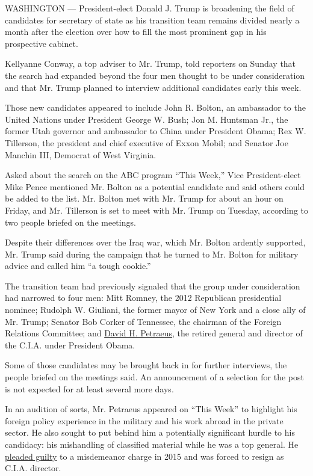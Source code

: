 WASHINGTON --- President-elect Donald J. Trump is broadening the field
of candidates for secretary of state as his transition team remains
divided nearly a month after the election over how to fill the most
prominent gap in his prospective cabinet.

Kellyanne Conway, a top adviser to Mr. Trump, told reporters on Sunday
that the search had expanded beyond the four men thought to be under
consideration and that Mr. Trump planned to interview additional
candidates early this week.

Those new candidates appeared to include John R. Bolton, an ambassador
to the United Nations under President George W. Bush; Jon M. Huntsman
Jr., the former Utah governor and ambassador to China under President
Obama; Rex W. Tillerson, the president and chief executive of Exxon
Mobil; and Senator Joe Manchin III, Democrat of West Virginia.

Asked about the search on the ABC program ``This Week,'' Vice
President-elect Mike Pence mentioned Mr. Bolton as a potential candidate
and said others could be added to the list. Mr. Bolton met with Mr.
Trump for about an hour on Friday, and Mr. Tillerson is set to meet with
Mr. Trump on Tuesday, according to two people briefed on the meetings.

Despite their differences over the Iraq war, which Mr. Bolton ardently
supported, Mr. Trump said during the campaign that he turned to Mr.
Bolton for military advice and called him ``a tough cookie.''

The transition team had previously signaled that the group under
consideration had narrowed to four men: Mitt Romney, the 2012 Republican
presidential nominee; Rudolph W. Giuliani, the former mayor of New York
and a close ally of Mr. Trump; Senator Bob Corker of Tennessee, the
chairman of the Foreign Relations Committee; and
\href{http://topics.nytimes.com/top/reference/timestopics/people/p/david_h_petraeus/index.html?inline=nyt-per}{David
H. Petraeus}, the retired general and director of the C.I.A. under
President Obama.

Some of those candidates may be brought back in for further interviews,
the people briefed on the meetings said. An announcement of a selection
for the post is not expected for at least several more days.

In an audition of sorts, Mr. Petraeus appeared on ``This Week'' to
highlight his foreign policy experience in the military and his work
abroad in the private sector. He also sought to put behind him a
potentially significant hurdle to his candidacy: his mishandling of
classified material while he was a top general. He
\href{http://www.nytimes.com/2015/03/04/us/petraeus-plea-deal-over-giving-classified-data-to-lover.html}{pleaded
guilty} to a misdemeanor charge in 2015 and was forced to resign as
C.I.A. director.

